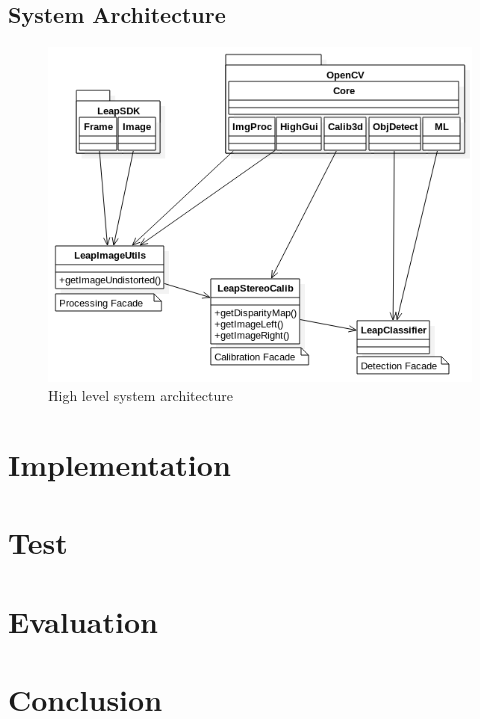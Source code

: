 \documentclass[11pt,oneside]{report}
\begin{document}
	\section{System Architecture}
	\begin{figure}[ht]
			\begin{center}
    			\includegraphics[scale=0.5]{system_architecture_1}
    			\caption{High level system architecture \protect {\label{fig:system_arch_1}}}
    		\end{center}
			\end{figure}	
	\chapter{Implementation}\label{chap:imp}
	
	\chapter{Test}\label{chap:test}
	
	\chapter{Evaluation}\label{chap:eval}
	
	\chapter{Conclusion}\label{chap:concl}

	
	
\end{document}
